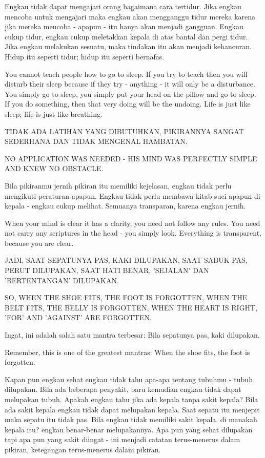 \bahasa
Engkau tidak dapat mengajari orang bagaimana cara tertidur. Jika engkau mencoba untuk mengajari maka engkau akan mengganggu tidur mereka karena jika mereka mencoba - apapun - itu hanya akan menjadi gangguan. Engkau cukup tidur, engkau cukup meletakkan kepala di atas bantal dan pergi tidur. Jika engkau melakukan sesuatu, maka tindakan itu akan menjadi kehancuran. Hidup itu seperti tidur; hidup itu seperti bernafas.

\english
You cannot teach people how to go to sleep. If you try to teach then you will disturb their sleep because if they try - anything - it will only be a disturbance. You simply go to sleep, you simply put your head on the pillow and go to sleep. If you do something, then that very doing will be the undoing. Life is just like sleep; life is just like breathing.

\bahasa
TIDAK ADA LATIHAN YANG DIBUTUHKAN, PIKIRANNYA SANGAT SEDERHANA DAN TIDAK MENGENAL HAMBATAN.


\english
NO APPLICATION WAS NEEDED - HIS MIND WAS PERFECTLY SIMPLE AND KNEW NO OBSTACLE.

\bahasa
Bila pikiranmu jernih pikiran itu memiliki kejelasan, engkau tidak perlu mengikuti peraturan apapun. Engkau tidak perlu membawa kitab suci apapun di kepala - engkau cukup melihat. Semuanya transparan, karena engkau jernih.

\english
When your mind is clear it has a clarity, you need not follow any rules. You need not carry any scriptures in the head - you simply look. Everything is transparent, because you are clear.

\bahasa
JADI, SAAT SEPATUNYA PAS, KAKI DILUPAKAN, SAAT SABUK PAS, PERUT DILUPAKAN, SAAT HATI BENAR, 'SEJALAN' DAN 'BERTENTANGAN' DILUPAKAN.

\english
SO, WHEN THE SHOE FITS, THE FOOT IS FORGOTTEN, WHEN THE BELT FITS, THE BELLY IS FORGOTTEN, WHEN THE HEART IS RIGHT, 'FOR' AND 'AGAINST' ARE FORGOTTEN.

\bahasa
Ingat, ini adalah salah satu mantra terbesar: Bila sepatunya pas, kaki dilupakan.

\english
Remember, this is one of the greatest mantras: When the shoe fits, the foot is forgotten.

\bahasa
Kapan pun engkau sehat engkau tidak tahu apa-apa tentang tubuhmu - tubuh dilupakan. Bila ada beberapa penyakit, baru kemudian engkau tidak dapat melupakan tubuh. Apakah engkau tahu jika ada kepala tanpa sakit kepala? Bila ada sakit kepala engkau tidak dapat melupakan kepala. Saat sepatu itu menjepit maka sepatu itu tidak pas. Bila engkau tidak memiliki sakit kepala, di manakah kepala itu? engkau benar-benar melupakannya. Apa pun yang sehat dilupakan tapi apa pun yang sakit diingat - ini menjadi catatan terus-menerus dalam pikiran, ketegangan terus-menerus dalam pikiran.

